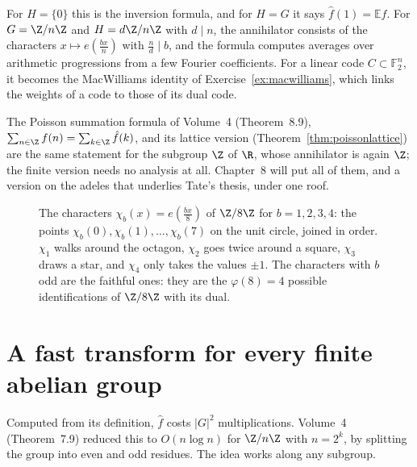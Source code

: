 For $H=\{0\}$ this is the inversion formula, and for $H=G$ it says $\hat f(1)=\mathbb E f$. For $G=\Z/n\Z$ and $H=d\Z/n\Z$ with $d\mid n$, the
annihilator consists of the characters $x\mapsto e(\frac{bx}n)$ with $\frac nd\mid b$, and the formula computes averages over arithmetic
progressions from a few Fourier coefficients. For a linear code $C\subset\mathbb F_2^n$, it becomes the MacWilliams identity of
Exercise~\ref{ex:macwilliams}, which links the weights of a code to those of its dual code.

\begin{beauty}
The Poisson summation formula of Volume~4 (Theorem~8.9), $\sum_{n\in\Z}f(n)=\sum_{k\in\Z}\hat f(k)$, and its lattice version
(Theorem~\ref{thm:poissonlattice}) are the same statement for the subgroup $\Z$ of $\R$, whose annihilator is again $\Z$; the finite
version needs no analysis at all. Chapter~8 will put all of them, and a version on the adeles that underlies Tate's thesis, under one
roof.
\end{beauty}

\begin{figure}[ht]
\centering
{}
\caption{The characters $\chi_b(x)=e(\frac{bx}8)$ of $\Z/8\Z$ for $b=1,2,3,4$: the points $\chi_b(0),\chi_b(1),\dots,\chi_b(7)$ on the unit circle,
joined in order. $\chi_1$ walks around the octagon, $\chi_2$ goes twice around a square, $\chi_3$ draws a star, and $\chi_4$ only takes the
values $\pm1$. The characters with $b$ odd are the faithful ones: they are the $\varphi(8)=4$ possible identifications of $\Z/8\Z$ with its dual.}
\label{fig:characters}
\end{figure}

\section{A fast transform for every finite abelian group}

Computed from its definition, $\hat f$ costs $|G|^2$ multiplications. Volume~4 (Theorem~7.9) reduced this to $O(n\log n)$ for $\Z/n\Z$ with
$n=2^k$, by splitting the group into even and odd residues. The idea works along any subgroup.

